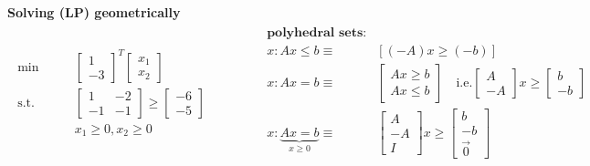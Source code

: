 \begin{example-N}
\begin{center}
		\end{center}
		\textbf{Solving (LP) geometrically}\\
		\begin{gather*}
			\begin{split}
				\text{min} \qquad & \begin{bmatrix}
					1\\-3
				\end{bmatrix}^T \begin{bmatrix}
					x_1\\x_2
				\end{bmatrix}\\
				\text{s.t.} \qquad & \begin{bmatrix}
					1 & -2\\
					-1 & -1
				\end{bmatrix} \geq 
				\begin{bmatrix}
					-6\\-5
				\end{bmatrix}\\
				& x_1 \geq 0, x_2 \geq 0
			\end{split}\hspace{4em}
			\begin{split}
				\textbf{polyhedral sets:}\\
				x: Ax \leq b \equiv \quad & [(-A)x \geq (-b)]\\
				x: Ax = b \equiv \quad & \begin{bmatrix}
					Ax \geq b\\
					Ax \leq b
				\end{bmatrix} \quad \text{i.e.} \begin{bmatrix}
					A\\-A
				\end{bmatrix} x \geq \begin{bmatrix}
					b\\-b
				\end{bmatrix}\\
				x: \underbrace{Ax = b}_{x \geq 0} \equiv \quad & \begin{bmatrix}
					A\\-A\\I
				\end{bmatrix} x \geq \begin{bmatrix}
					b\\-b\\ \vec{0}

\end{bmatrix}
\end{split}
\end{gather*}
\end{example-N}
